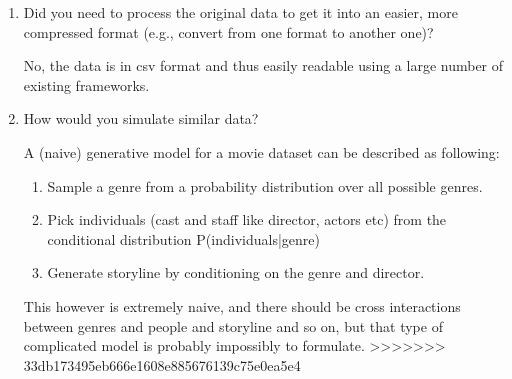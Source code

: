 \documentclass[11pt]{article}
\begin{document}
\begin{enumerate}
\item Did you need to process the original data to get it into an easier, more compressed format (e.g., convert from one format to another one)?

No, the data is in csv format and thus easily readable using a large number of existing frameworks.

\item How would you simulate similar data?

A (naive) generative model for a movie dataset can be described as following:
	\begin{enumerate}
		\item Sample a genre from a probability distribution over all possible genres.
		\item Pick individuals (cast and staff like director, actors etc) from the conditional distribution P(individuals|genre)
		\item Generate storyline by conditioning on the genre and director.
	\end{enumerate}
This however is extremely naive, and there should be cross interactions between genres and people and storyline and so on, but that type of complicated model is probably impossibly to formulate.
>>>>>>> 33db173495eb666e1608e885676139c75e0ea5e4
\end{enumerate}
\end{document}
